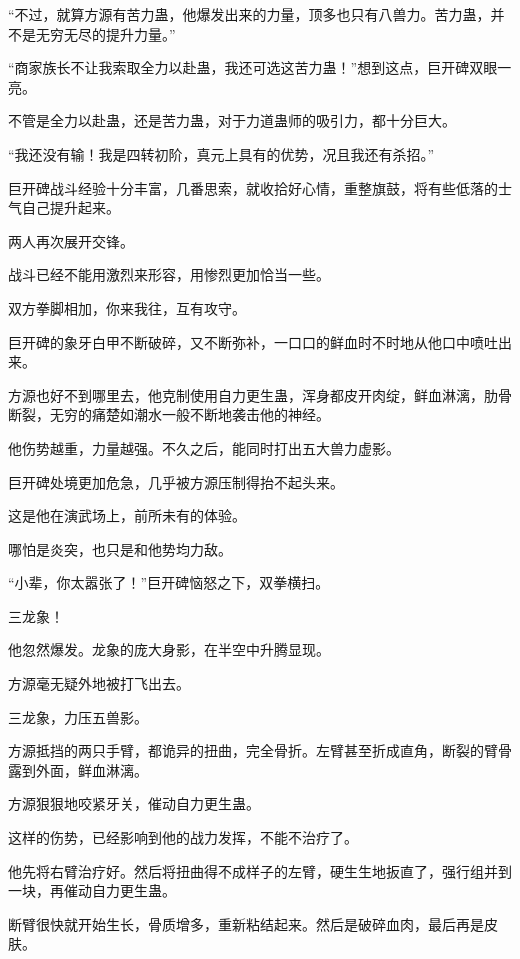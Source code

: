 
\begin{this_body}



“不过，就算方源有苦力蛊，他爆发出来的力量，顶多也只有八兽力。苦力蛊，并不是无穷无尽的提升力量。”

“商家族长不让我索取全力以赴蛊，我还可选这苦力蛊！”想到这点，巨开碑双眼一亮。

不管是全力以赴蛊，还是苦力蛊，对于力道蛊师的吸引力，都十分巨大。

“我还没有输！我是四转初阶，真元上具有的优势，况且我还有杀招。”

巨开碑战斗经验十分丰富，几番思索，就收拾好心情，重整旗鼓，将有些低落的士气自己提升起来。

两人再次展开交锋。

战斗已经不能用激烈来形容，用惨烈更加恰当一些。

双方拳脚相加，你来我往，互有攻守。

巨开碑的象牙白甲不断破碎，又不断弥补，一口口的鲜血时不时地从他口中喷吐出来。

方源也好不到哪里去，他克制使用自力更生蛊，浑身都皮开肉绽，鲜血淋漓，肋骨断裂，无穷的痛楚如潮水一般不断地袭击他的神经。

他伤势越重，力量越强。不久之后，能同时打出五大兽力虚影。

巨开碑处境更加危急，几乎被方源压制得抬不起头来。

这是他在演武场上，前所未有的体验。

哪怕是炎突，也只是和他势均力敌。

“小辈，你太嚣张了！”巨开碑恼怒之下，双拳横扫。

三龙象！

他忽然爆发。龙象的庞大身影，在半空中升腾显现。

方源毫无疑外地被打飞出去。

三龙象，力压五兽影。

方源抵挡的两只手臂，都诡异的扭曲，完全骨折。左臂甚至折成直角，断裂的臂骨露到外面，鲜血淋漓。

方源狠狠地咬紧牙关，催动自力更生蛊。

这样的伤势，已经影响到他的战力发挥，不能不治疗了。

他先将右臂治疗好。然后将扭曲得不成样子的左臂，硬生生地扳直了，强行组并到一块，再催动自力更生蛊。

断臂很快就开始生长，骨质增多，重新粘结起来。然后是破碎血肉，最后再是皮肤。


\end{this_body}
